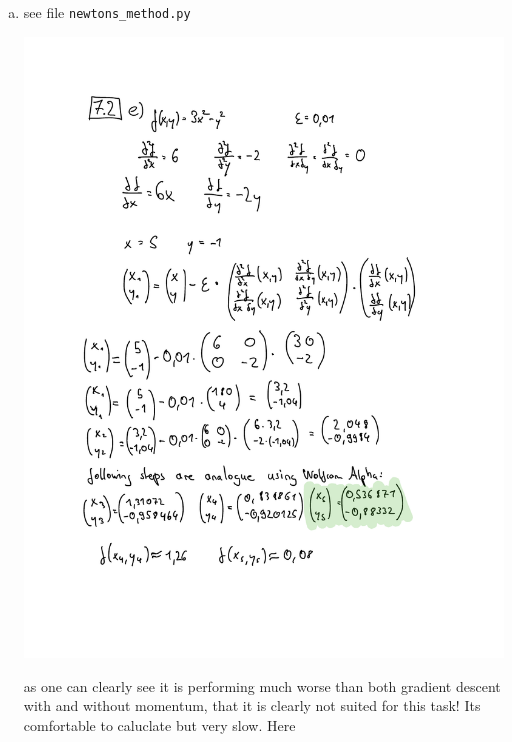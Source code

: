 \documentclass[12pt]{article}
\begin{document}
\begin{enumerate}[a)]
    \item
        see file \verb!newtons_method.py!\\
        \begin{center}
            \includegraphics[scale = 0.8]{pictures/calculation}\\
        \end{center}

        as one can clearly see it is performing much worse than both gradient descent with and without momentum, that it is clearly not suited for this task! Its comfortable to caluclate but very slow. Here 

\end{enumerate}
\end{document}
